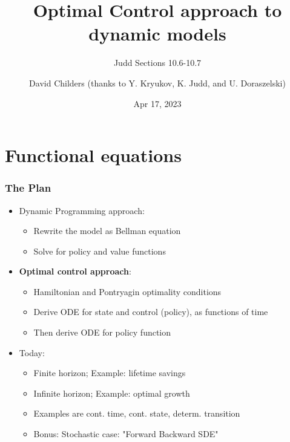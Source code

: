 \documentclass[bigger,handout]{beamer}
\begin{document}
\title[47-809: Control]{Optimal Control approach to dynamic models}
\subtitle{Judd Sections 10.6-10.7}
\author[David Childers]{David Childers (thanks to Y. Kryukov, K. Judd, and U. Doraszelski)}
\date[Apr 17]{Apr 17, 2023}
\maketitle

\section{Functional equations}

 
 
\begin{frame}%
 
\frametitle{The Plan}

\begin{itemize}
\item Dynamic Programming approach:

\begin{itemize}
\item Rewrite the model as Bellman equation

\item Solve for policy and value functions
\end{itemize}

\item \textbf{Optimal control approach}:

\begin{itemize}
\item Hamiltonian and Pontryagin optimality conditions

\item Derive ODE for state and control (policy), \newline
as functions of time

\item Then derive ODE for policy function
\end{itemize}

\item Today:

\begin{itemize}
\item Finite horizon; Example: lifetime savings

\item Infinite horizon; Example: optimal growth

\item Examples are cont. time, cont. state, determ. transition

\item Bonus: Stochastic case: "Forward Backward SDE"
\end{itemize}
\end{itemize}

 
 
\end{frame}%
 
\end{document}

